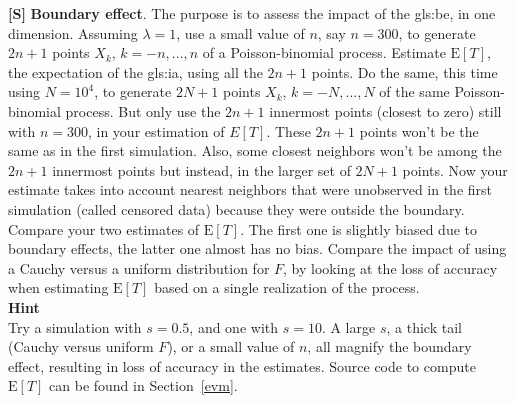 \documentclass[10pt]{article}
\begin{document}
\begin{Exercise}\label{exercise9}
{\bf [S]}  {\bf Boundary effect}. The purpose is to assess the impact of the \gls{gls:be}, in one dimension. Assuming $\lambda=1$, use a small value of $n$, say $n=300$, to generate $2n+1$ points $X_k$, $k=-n,\dots,n$ of a Poisson-binomial process. Estimate $\mbox{E}[T]$, the expectation of the
\gls{gls:ia}, using all the $2n+1$ points.
Do the same, this time using $N=10^4$,  to generate $2N+1$ points $X_k$, $k=-N,\dots,N$ of the same Poisson-binomial process.
But only use the $2n+1$ innermost points (closest to zero) still with $n=300$,  in your
estimation of $E[T]$. These $2n+1$ points won't be the same as in the first simulation. Also, some closest neighbors won't be among the $2n+1$ innermost points but instead, in the larger set of $2N+1$ points. Now your estimate takes into account nearest neighbors that were unobserved in the first simulation (called
 \textcolor{index}{censored data}) because they were outside the boundary. Compare your two estimates of $\mbox{E}[T]$. The first one is slightly biased due to boundary effects, the latter one almost has no bias.
Compare the impact of using a Cauchy versus a uniform distribution for $F$, by looking at the loss of accuracy when estimating $\mbox{E}[T]$ based on a single realization of the process.  \vspace{1ex}\\
{\bf Hint} \vspace{1ex}\\
Try a simulation with $s=0.5$, and one with $s=10$. A large $s$, a thick tail (Cauchy versus uniform $F$), or a small value of $n$, all magnify the boundary effect, resulting in loss of accuracy in the estimates. Source code to compute $\mbox{E}[T]$ can be found in Section~\ref{evm}.
\end{Exercise}
\end{document}
